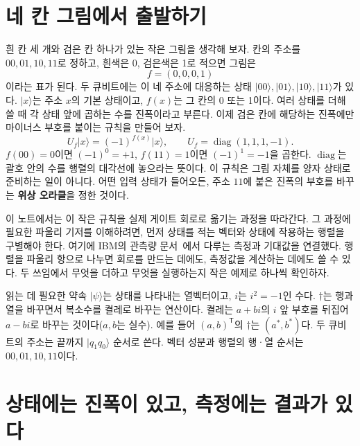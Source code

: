 
\section{네 칸 그림에서 출발하기}

흰 칸 세 개와 검은 칸 하나가 있는 작은 그림을 생각해 보자. 칸의 주소를
\(00,01,10,11\)로 정하고, 흰색은 0, 검은색은 1로 적으면 그림은
\[
f=(0,0,0,1)
\]
이라는 표가 된다. 두 큐비트에는 이 네 주소에 대응하는 상태
\(\lvert00\rangle,\lvert01\rangle,\lvert10\rangle,\lvert11\rangle\)가 있다.
\(\lvert x\rangle\)는 주소 \(x\)의 기본 상태이고, \(f(x)\)는 그 칸의 0 또는 1이다.
여러 상태를 더해 쓸 때 각 상태 앞에 곱하는 수를 진폭이라고 부른다.
이제 검은 칸에 해당하는 진폭에만 마이너스 부호를 붙이는 규칙을 만들어 보자.
\[
U_f\lvert x\rangle=(-1)^{f(x)}\lvert x\rangle,
\qquad U_f=\operatorname{diag}(1,1,1,-1).
\]
\(f(00)=0\)이면 \((-1)^0=+1\), \(f(11)=1\)이면 \((-1)^1=-1\)을 곱한다.
\(\operatorname{diag}\)는 괄호 안의 수를 행렬의 대각선에 놓으라는 뜻이다.
이 규칙은 그림 자체를 양자 상태로 준비하는 일이 아니다. 어떤 입력 상태가 들어오든,
주소 \(11\)에 붙은 진폭의 부호를 바꾸는 \textbf{위상 오라클}을 정한 것이다.

이 노트에서는 이 작은 규칙을 실제 게이트 회로로 옮기는 과정을 따라간다.
그 과정에 필요한 파울리 기저를 이해하려면, 먼저 상태를 적는 벡터와 상태에 작용하는 행렬을
구별해야 한다. 여기에 IBM의 관측량 문서~\cite{ibm-observables}에서 다루는
측정과 기대값을 연결했다. 행렬을 파울리 항으로 나누면 회로를 만드는 데에도,
측정값을 계산하는 데에도 쓸 수 있다. 두 쓰임에서 무엇을 더하고 무엇을 실행하는지
작은 예제로 하나씩 확인하자.

\begin{notebox}{읽는 데 필요한 약속}
\(\lvert\psi\rangle\)는 상태를 나타내는 열벡터이고, \(i\)는 \(i^2=-1\)인 수다.
\(\dagger\)는 행과 열을 바꾸면서 복소수를 켤레로 바꾸는 연산이다.
켤레는 \(a+bi\)의 \(i\) 앞 부호를 뒤집어 \(a-bi\)로 바꾸는 것이다(\(a,b\)는 실수).
예를 들어 \((a,b)^\mathsf{T}\)의 \(\dagger\)는 \((a^*,b^*)\)다.
두 큐비트의 주소는 끝까지 \(\lvert q_1q_0\rangle\) 순서로 쓴다.
벡터 성분과 행렬의 행·열 순서는 \(00,01,10,11\)이다.
\end{notebox}

\section{상태에는 진폭이 있고, 측정에는 결과가 있다}

